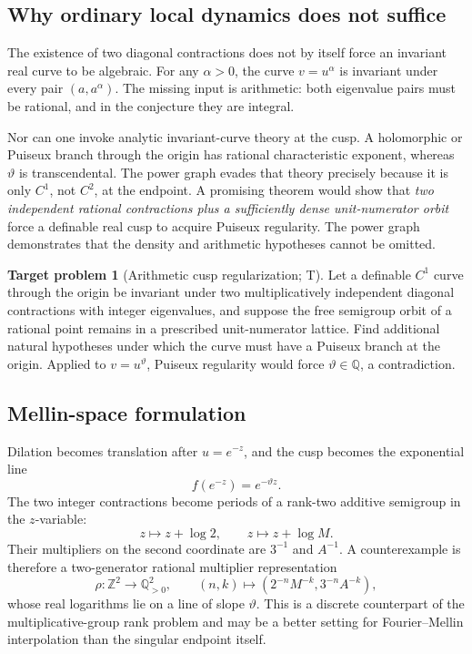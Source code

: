 \documentclass[10pt,oneside]{article}
\theoremstyle{definition}
\newtheorem{problem}[theorem]{Target problem}
\theoremstyle{remark}
\newcommand{\Z}{\mathbb Z}
\newcommand{\Q}{\mathbb Q}
\newcommand{\thetaq}{\vartheta}
\newcommand{\statusT}{\textsc{T}}
\begin{document}
\subsection{Why ordinary local dynamics does not suffice}
The existence of two diagonal contractions does not by itself force an invariant real curve to be algebraic.  For any \(\alpha>0\), the curve \(v=u^\alpha\) is invariant under every pair \((a,a^\alpha)\).  The missing input is arithmetic: both eigenvalue pairs must be rational, and in the conjecture they are integral.

Nor can one invoke analytic invariant-curve theory at the cusp.  A holomorphic or Puiseux branch through the origin has rational characteristic exponent, whereas \(\thetaq\) is transcendental.  The power graph evades that theory precisely because it is only \(C^1\), not \(C^2\), at the endpoint.  A promising theorem would show that \emph{two independent rational contractions plus a sufficiently dense unit-numerator orbit} force a definable real cusp to acquire Puiseux regularity.  The power graph demonstrates that the density and arithmetic hypotheses cannot be omitted.

\begin{problem}[Arithmetic cusp regularization; \statusT]
\label{prob:cusp-regularization}
Let a definable \(C^1\) curve through the origin be invariant under two multiplicatively independent diagonal contractions with integer eigenvalues, and suppose the free semigroup orbit of a rational point remains in a prescribed unit-numerator lattice.  Find additional natural hypotheses under which the curve must have a Puiseux branch at the origin.  Applied to \(v=u^{\thetaq}\), Puiseux regularity would force \(\thetaq\in\Q\), a contradiction.
\end{problem}

\subsection{Mellin-space formulation}
Dilation becomes translation after \(u=e^{-z}\), and the cusp becomes the exponential line
\[
 f(e^{-z})=e^{-\thetaq z}.
\]
The two integer contractions become periods of a rank-two additive semigroup in the \(z\)-variable:
\[
 z\mapsto z+\log2,
 \qquad
 z\mapsto z+\log M.
\]
Their multipliers on the second coordinate are \(3^{-1}\) and \(A^{-1}\).  A counterexample is therefore a two-generator rational multiplier representation
\[
 \rho:\Z^2\longrightarrow\Q_{>0}^2,
 \qquad
 (n,k)\longmapsto(2^{-n}M^{-k},3^{-n}A^{-k}),
\]
whose real logarithms lie on a line of slope \(\thetaq\).  This is a discrete counterpart of the multiplicative-group rank problem and may be a better setting for Fourier--Mellin interpolation than the singular endpoint itself.
\end{document}
